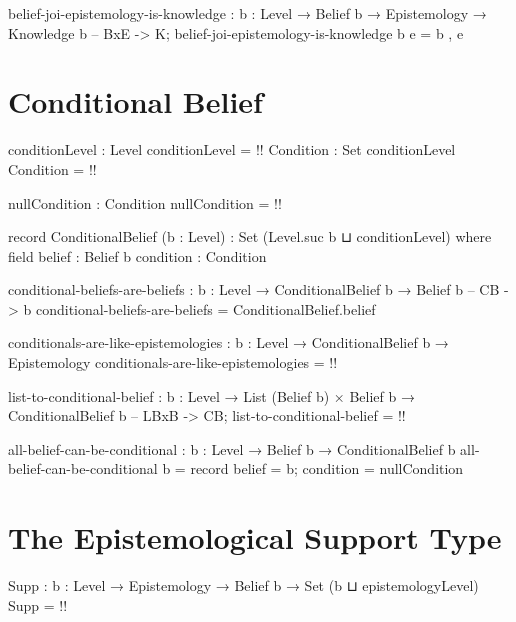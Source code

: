 \documentclass{article}
\begin{document}
\begin{code}
belief-joi-epistemology-is-knowledge :
  {b : Level} → Belief b → Epistemology → Knowledge b -- BxE -> K;
belief-joi-epistemology-is-knowledge b e = b , e
\end{code}

\section{Conditional Belief}

\begin{code}
conditionLevel : Level
conditionLevel = {!!}
Condition : Set conditionLevel
Condition = {!!}

nullCondition : Condition
nullCondition = {!!}

record ConditionalBelief (b : Level) : Set (Level.suc b ⊔ conditionLevel) where
  field
    belief : Belief b
    condition : Condition
\end{code}

\begin{code}
conditional-beliefs-are-beliefs : {b : Level} → ConditionalBelief b → Belief b -- CB -> b
conditional-beliefs-are-beliefs = ConditionalBelief.belief
\end{code}

\begin{code}
conditionals-are-like-epistemologies :
  {b : Level} → ConditionalBelief b → Epistemology
conditionals-are-like-epistemologies = {!!}
\end{code}

\begin{code}
list-to-conditional-belief :
  {b : Level} → List (Belief b) × Belief b → ConditionalBelief b -- LBxB -> CB;
list-to-conditional-belief = {!!}
\end{code}

\begin{code}
all-belief-can-be-conditional : {b : Level} → Belief b → ConditionalBelief b
all-belief-can-be-conditional b = record {belief = b; condition = nullCondition}
\end{code}

\section{The Epistemological Support Type}

\begin{code}
Supp : {b : Level} → Epistemology → Belief b → Set (b ⊔ epistemologyLevel)
Supp = {!!}
\end{code}
\end{document}
